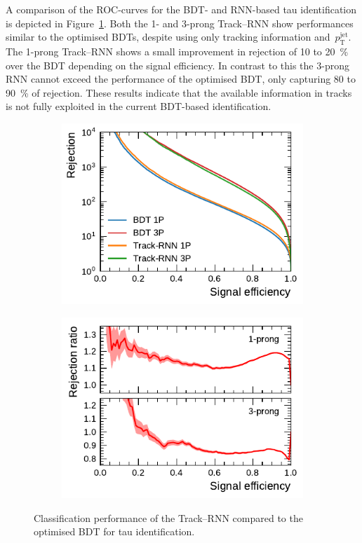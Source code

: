 A comparison of the ROC-curves for the BDT- and RNN-based tau identification is
depicted in Figure~\ref{fig:track_rnn_roc_ratios}. Both the 1- and 3-prong
Track--RNN show performances similar to the optimised BDTs, despite using only
tracking information and~$p_\text{T}^\text{jet}$. The 1-prong Track--RNN shows a
small improvement in rejection of \num{10} to \SI{20}{\percent} over the BDT
depending on the signal efficiency. In contrast to this the 3-prong RNN cannot
exceed the performance of the optimised BDT, only capturing \num{80} to
\SI{90}{\percent} of rejection. These results indicate that the available
information in tracks is not fully exploited in the current BDT-based
identification.

\begin{figure}[htb]
  \begin{subfigure}[t]{0.48\textwidth}
    \centering
    \includegraphics{./figures/rnn/track/roc.pdf}
  \end{subfigure}\hfill
  \begin{subfigure}[t]{0.48\textwidth}
    \centering
    \includegraphics{./figures/rnn/track/ratios.pdf}
  \end{subfigure}
  \caption{Classification performance of the Track--RNN compared to the
    optimised BDT for tau identification.}
  \label{fig:track_rnn_roc_ratios}
\end{figure}

